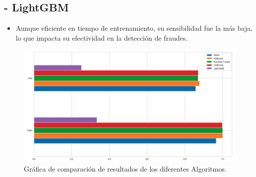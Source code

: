 \documentclass[9pt,a4paper,twoside]{rho-class/rho}
\begin{document}
        \subsection*{- LightGBM}
        \begin{itemize}
        \item Aunque eficiente en tiempo de entrenamiento, su sensibilidad fue la más baja, lo que impacta su efectividad en la detección de fraudes.
        \end{itemize}
        \begin{figure}[h]
            \centering
            \includegraphics[width=\linewidth]{figures/resultados.pdf}
            \caption{Gráfica de comparación de resultados de los diferentes Algoritmos.}
            \label{fig:sample_figure}
        \end{figure}
    
    \printbibliography
    
    \renewcommand{\contentsname}{Tabla de Contenidos}
    \tableofcontents
    \linenumbers


\end{document}
